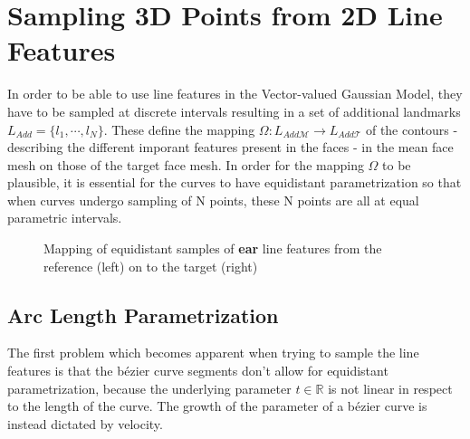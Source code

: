 \section{Sampling 3D Points from 2D Line Features} 
In order to be able to use line features in the Vector-valued Gaussian Model, they have to be sampled at discrete intervals resulting in a set of additional landmarks $L_{Add} = \{l_{1}, \cdots, l_{N}\}$. These define the mapping $\Omega:L_{Add\mathcal{M}} \rightarrow L_{Add\mathcal{T}}$ of the contours - describing the different imporant features present in the faces - in the mean face mesh on those of the target face mesh. In order for the mapping $\Omega$ to be plausible, it is essential
for the curves to have equidistant parametrization so that when curves undergo sampling of N points, these N points are all at equal parametric intervals.

\def\earpathf{(-1,1.5) .. controls (-1,2.3) and (1,2.8) .. (1,1.5) .. controls (1, -.2) and (0.3,-.1) .. (0.3,-1) .. controls (0.2,-1.5) and (-.5, -1.7) .. (-1,-1.25);}
\def\earpathl{(3,2) .. controls (3,3.3) and (5.6,3.7) .. (5.6,2) .. controls (5.6, 0) and (4.6,0) .. (4.6,-1.3) .. controls (4.6,-2) and (3.5, -2) .. (3,-1.5);}
\begin{figure}[h!]
    \centering
    \label{fig:DiffEars}
    \caption{Mapping of equidistant samples of \textbf{ear} line features from the reference (left) on to the target (right)}
\end{figure}

\subsection{Arc Length Parametrization}
The first problem which becomes apparent when trying to sample the line features is that the b\'{e}zier curve segments don't allow for equidistant parametrization, because the underlying parameter $t \in \mathbb{R}$ is not linear in respect to the length of the curve. The growth of the parameter of a b\'{e}zier curve is instead dictated by velocity.


